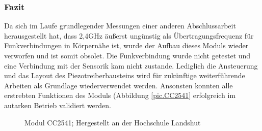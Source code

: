 \documentclass[12pt]{scrreprt} %
\begin{document}
\subsubsection{Fazit}
Da sich im Laufe grundlegender Messungen einer anderen Abschlussarbeit herausgestellt hat, dass 2,4GHz äußerst ungünstig als Übertragungsfrequenz für Funkverbindungen in Körpernähe ist, wurde der Aufbau dieses Moduls wieder verworfen und ist somit obsolet. Die Funkverbindung wurde nicht getestet und eine Verbindung mit der Sensorik kam nicht zustande. Lediglich die Ansteuerung und das Layout des Piezotreiberbausteins  wird für zukünftige weiterführende Arbeiten als Grundlage wiederverwendet werden. Ansonsten konnten alle erstrebten Funktionen des Moduls (Abbildung \vref{pic.CC2541} erfolgreich im autarken Betrieb validiert werden.
\begin{figure}
\centering
{}
\caption{Modul CC2541; Hergestellt an der Hochschule Landshut}
\label{pic.CC2541}
\end{figure}
\end{document}
